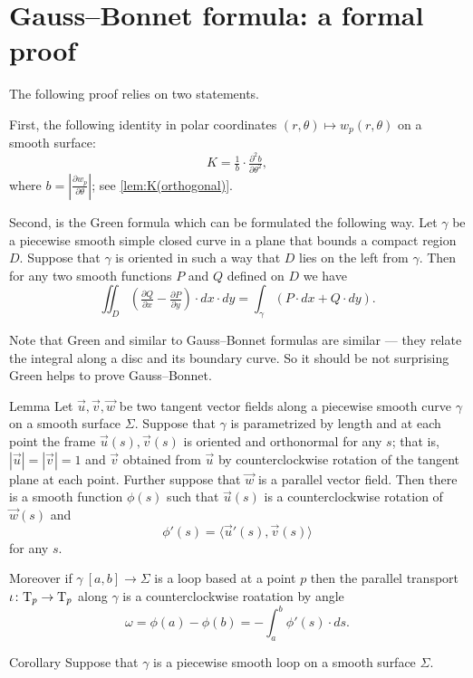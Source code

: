 \section{Gauss--Bonnet formula: a formal proof}\label{page:gauss--bonnet:formal}

The following proof relies on two statements.

First, the following identity in polar coordinates $(r,\theta)\mapsto w_p(r,\theta)$ on a smooth surface:
\[K=\tfrac1b\cdot\tfrac{\partial^2 b}{\partial \theta^2},\]
where $b=|\tfrac{\partial w_p}{\partial \theta}|$; see \ref{lem:K(orthogonal)}.

Second, is the Green formula which can be formulated the following way.
Let $\gamma$ be a piecewise smooth simple closed curve in a plane that bounds a compact region $D$.
Suppose that $\gamma$ is oriented in such a way that $D$ lies on the left from $\gamma$.
Then for any two smooth functions $P$ and $Q$ defined on $D$ we have
\[\iint_D (\tfrac{\partial Q}{\partial x}-\tfrac{\partial P}{\partial y})\cdot dx\cdot dy=\int_\gamma (P\cdot dx+Q\cdot dy).\]

Note that Green and similar to Gauss--Bonnet formulas are similar --- they relate the integral along a disc and its boundary curve.
So it should be not surprising Green helps to prove Gauss--Bonnet.

\begin{thm}{Lemma}
Let $\vec u,\vec v,\vec w$ be two tangent vector fields along a piecewise smooth curve $\gamma$ on a smooth surface $\Sigma$.
Suppose that $\gamma$ is parametrized by length and
at each point the frame $\vec u(s),\vec v(s)$ is oriented and orthonormal for any $s$;
that is, $|\vec u|=|\vec v|=1$ and $\vec v$ obtained from $\vec u$ by counterclockwise rotation of the tangent plane at each point.
Further suppose that $\vec w$ is a parallel vector field.
Then there is a smooth function $\phi(s)$ such that $\vec u(s)$ is a counterclockwise rotation of $\vec w(s)$ and
\[\phi'(s)=\langle\vec u'(s),\vec v(s)\rangle\]
for any $s$.

Moreover if $\gamma\:[a,b]\to\Sigma$ is a loop based at a point $p$ then the parallel transport $\iota\colon\mathrm{T}_p\to\mathrm{T}_p$ along $\gamma$ is a counterclockwise roatation by angle
\[\omega=\phi(a)-\phi(b)=-\int_a^b\phi'(s)\cdot ds.\]
\end{thm}

\begin{thm}{Corollary}
Suppose that $\gamma$ is a piecewise smooth loop on a smooth surface $\Sigma$.
\end{thm}

